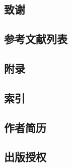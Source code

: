 \subsection{致谢}

\subsection{参考文献列表}

\subsection{附录}

\subsection{索引}

\subsection{作者简历}

\subsection{出版授权}



